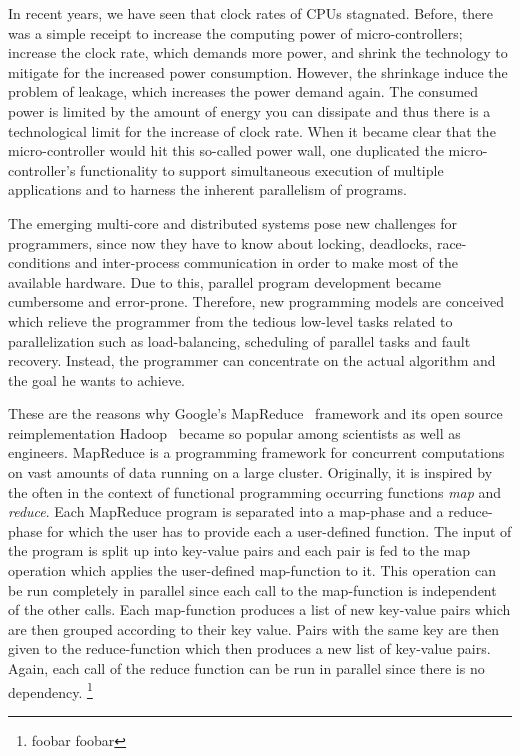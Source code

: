 In recent years, we have seen that clock rates of CPUs stagnated.
Before, there was a simple receipt to increase the computing power of micro-controllers; increase the clock rate, which demands more power, and shrink the technology to mitigate for the increased power consumption.
However, the shrinkage induce the problem of leakage, which increases the power demand again.
The consumed power is limited by the amount of energy you can dissipate and thus there is a technological limit for the increase of clock rate.
When it became clear that the micro-controller would hit this so-called power wall, one duplicated the micro-controller's functionality to support simultaneous execution of multiple applications and to harness the inherent parallelism of programs.

The emerging multi-core and distributed systems pose new challenges for programmers, since now they have to know about locking, deadlocks, race-conditions and inter-process communication in order to make most of the available hardware.
Due to this, parallel program development became cumbersome and error-prone.
Therefore, new programming models are conceived which relieve the programmer from the tedious low-level tasks related to parallelization such as load-balancing, scheduling of parallel tasks and fault recovery.
Instead, the programmer can concentrate on the actual algorithm and the goal he wants to achieve.

These are the reasons why Google's MapReduce~\cite{dean:c2008a} framework and its open source reimplementation Hadoop~\cite{hadoop:2008a} became so popular among scientists as well as engineers.
MapReduce is a programming framework for concurrent computations on vast amounts of data running on a large cluster. 
Originally, it is inspired by the often in the context of functional programming occurring functions \emph{map} and \emph{reduce}.
Each MapReduce program is separated into a map-phase and a reduce-phase for which the user has to provide each a user-defined function.
The input of the program is split up into key-value pairs and each pair is fed to the map operation which applies the user-defined map-function to it.
This operation can be run completely in parallel since each call to the map-function is independent of the other calls.
Each map-function produces a list of new key-value pairs which are then grouped according to their key value.
Pairs with the same key are then given to the reduce-function which then produces a new list of key-value pairs.
Again, each call of the reduce function can be run in parallel since there is no dependency. \footnote{foobar foobar}

